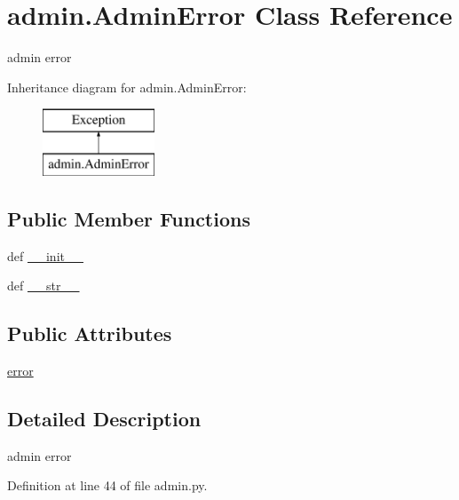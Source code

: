 \hypertarget{classadmin_1_1AdminError}{\section{admin.\-Admin\-Error Class Reference}
\label{classadmin_1_1AdminError}
}


admin error  


Inheritance diagram for admin.\-Admin\-Error\-:\begin{figure}[H]
\begin{center}
\leavevmode
\includegraphics[height=2.000000cm]{df/dee/classadmin_1_1AdminError}
\end{center}
\end{figure}
\subsection*{Public Member Functions}
\begin{DoxyCompactItemize}
\item 
def \hyperlink{classadmin_1_1AdminError_a2712ee3b794fa425e6e0eac6a1524749}{\-\_\-\-\_\-init\-\_\-\-\_\-}
\item 
def \hyperlink{classadmin_1_1AdminError_ab64b4ac0bacc03d3f5d4dc556a493445}{\-\_\-\-\_\-str\-\_\-\-\_\-}
\end{DoxyCompactItemize}
\subsection*{Public Attributes}
\begin{DoxyCompactItemize}
\item 
\hyperlink{classadmin_1_1AdminError_a2d3933c27c7f643bf649f9f208f35c72}{error}
\end{DoxyCompactItemize}


\subsection{Detailed Description}
admin error 

Definition at line 44 of file admin.\-py.




